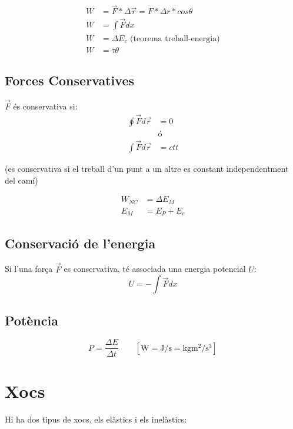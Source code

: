 \begin{align}
    W &= \vec{F}*\Delta \vec{r} = F * \Delta r * cos\theta \\
    W &= \int \vec{F}dx \\
    W &= \Delta E_c \text{ (teorema treball-energia)} \\
    W &= \tau \theta
\end{align}

\subsection{Forces Conservatives}
$\vec{F}$ és conservativa si:
\begin{align*}
    \oint \vec{F}d\vec{r} &= 0 \\
    &\text{ó} \\
    \int \vec{F}d\vec{r} &= ctt
\end{align*}

\begin{center}
    (es conservativa si el treball d'un punt a un altre es constant independentment del camí)
\end{center}

\begin{align}
    W_{NC} &= \Delta E_M \\
    E_M &= E_P + E_c
\end{align}

\subsection{Conservació de l'energia}
Si l'una força $\vec{F}$ es conservativa, té associada una energia potencial $U$:
\begin{equation}
    U = - \int \vec{F} dx 
\end{equation}
\subsection{Potència}
\begin{equation}
    P = \frac{\Delta E}{\Delta t} \qquad \left[  \si{\watt} =\si{\joule\per\second} = \si{\kilo\gram\metre\squared\per\second\cubed}\right]
\end{equation}

\section{Xocs}
Hi ha dos tipus de xocs, els elàstics i els inelàstics:

